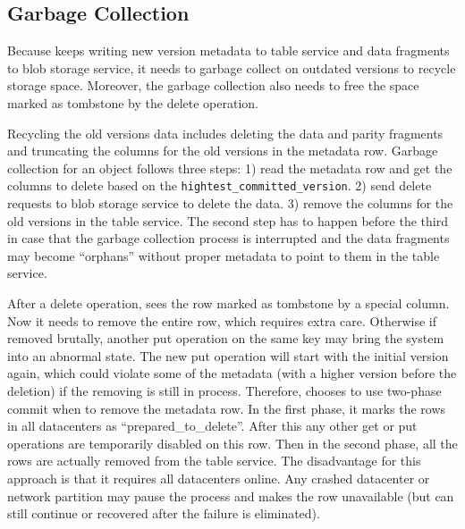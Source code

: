 
\subsection{Garbage Collection}
Because {\name} keeps writing new version metadata to table service and data fragments
to blob storage service, it needs to garbage collect on outdated versions to recycle
storage space. Moreover, the garbage collection also needs to free the space marked as
tombstone by the delete operation.

Recycling the old versions data includes deleting the data and parity fragments and
truncating the columns for the old versions in the metadata row. Garbage collection
for an object follows three steps: 1) read the metadata row and get the columns to
delete based on the \texttt{hightest\_committed\_version}. 2) send delete requests to
blob storage service to delete the data. 3) remove the columns for the old versions
in the table service. The second step has to happen before the third in case that the
garbage collection process is interrupted and the data fragments may become ``orphans''
without proper metadata to point to them in the table service.

After a delete operation, {\name} sees the row marked as tombstone by a special column.
Now it needs to remove the entire row, which requires extra care. Otherwise if removed
brutally, another put operation on the same key may bring the system into an abnormal
state. The new put operation will start with the initial version again, which could
violate some of the metadata (with a higher version before the deletion) if the removing is still in
process. Therefore, {\name} chooses to use two-phase commit when to remove the metadata
row. In the first phase, it marks the rows in all datacenters as ``prepared\_to\_delete''.
After this any other get or put operations are temporarily disabled on this row. Then
in the second phase, all the rows are actually removed from the table service. The
disadvantage for this approach is that it requires all datacenters online. Any crashed
datacenter or network partition may pause the process and makes the row unavailable
(but can still continue or recovered after the failure is eliminated). 




